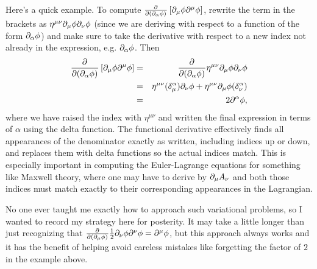 Here's a quick example. To compute $\frac{\partial^{} }{\partial (\partial_\alpha \phi) ^{}}\left[ \partial_\mu \phi \partial^\mu \phi\right]$, rewrite the term in the brackets as $\eta^{\mu\nu}\partial_\mu \phi \partial_\nu \phi$ (since we are deriving with respect to a function of the form $\partial_\alpha \phi$) and make sure to take the derivative with respect to a new index not already in the expression, e.g. $\partial_\alpha \phi$. Then 
\begin{eqnarray*}
\frac{\partial^{} }{\partial (\partial_\alpha \phi) ^{}}\left[ \partial_\mu \phi \partial^\mu \phi\right]&=&\frac{\partial^{} }{\partial (\partial_\alpha \phi) ^{}}\eta^{\mu\nu}\partial_\mu \phi \partial_\nu \phi\\
&=& \eta^{\mu\nu} (\delta^\alpha_\mu)\partial_\nu \phi + \eta^{\mu\nu} \partial_\mu \phi (\delta _\nu^\alpha)\\
&=&2\partial^\alpha \phi,
\end{eqnarray*}
where we have raised the index with $\eta^{\mu\nu}$ and written the final expression in terms of $\alpha$ using the delta function. The functional derivative effectively finds all appearances of the denominator exactly as written, including indices up or down, and replaces them with delta functions so the actual indices match. This is especially important in computing the Euler-Lagrange equations for something like Maxwell theory, where one may have to derive by $\partial_\mu A_\nu$ and both those indices must match exactly to their corresponding appearances in the Lagrangian.

No one ever taught me exactly how to approach such variational problems, so I wanted to record my strategy here for posterity. It may take a little longer than just recognizing that $\frac{\partial^{} }{\partial (\partial_\mu \phi) ^{}} \frac{1}{2}\partial_\nu \phi \partial^\nu \phi = \partial^\mu \phi$, but this approach always works and it has the benefit of helping avoid careless mistakes like forgetting the factor of $2$ in the example above.